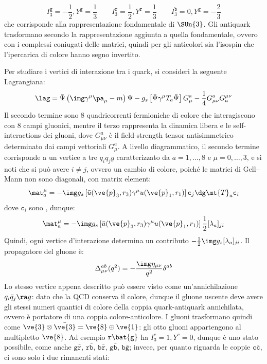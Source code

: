 \begin{equation*}
  I_3^\mathtt{g} = -\frac{1}{2} , Y^\mathtt{g} = \frac{1}{3}
  \qquad
  I_3^\mathtt{r} = \frac{1}{2} , Y^\mathtt{r} = \frac{1}{3}
  \qquad
  I_3^\mathtt{b} = 0 , Y^\mathtt{g} = - \frac{2}{3}
\end{equation*}
che corrisponde alla rappresentazione fondamentale di $ \SUn{3} $. Gli antiquark trasformano secondo la rappresentazione aggiunta a quella fondamentale, ovvero con i complessi coniugati delle matrici, quindi per gli anticolori sia l'isospin che l'ipercarica di colore hanno segno invertito.

Per studiare i vertici di interazione tra i quark, si consideri la seguente Lagrangiana:
\begin{equation}
  \lag = \bar{\Psi} \left( \img \gamma^\mu \pa_\mu - m \right) \Psi - g_s \left[ \bar{\Psi} \gamma^\mu T_a \bar{\Psi} \right] G_\mu^a - \frac{1}{4} G_{\mu \nu}^a G_a^{\mu \nu}
\end{equation}
Il secondo termine sono 8 quadricorrenti fermioniche di colore che interagiscono con 8 campi gluonici, mentre il terzo rappresenta la dinamica libera e le self-interactions dei gluoni, dove $ G_{\mu \nu}^a $ è il field-strength tensor antisimmetrico determinato dai campi vettoriali $ G_\mu^a $. A livello diagrammatico, il secondo termine corrisponde a un vertice a tre $ q_i q_j g $ caratterizzato da $ a = 1, \dots, 8 $ e $ \mu = 0 , \dots , 3 $, e si noti che si può avere $ i \neq j $, ovvero un cambio di colore, poiché le matrici di Gell--Mann non sono diagonali, con matrix element:
\begin{equation*}
  \mat^\mu_a = -\img g_s \left[ \bar{u}(\ve{p}_3 , r_3) \gamma^\mu u(\ve{p}_1 , r_1) \right] \mathtt{c}_j\dg \mt{T}_a \mathtt{c}_i
\end{equation*}
dove $ \mathtt{c}_i $ sono , dunque:
\begin{equation}
  \mat_a^\mu = - \img g_s \left[ \bar{u}(\ve{p}_3 , r_3) \gamma^\mu u(\ve{p}_1 , r_1) \right] \frac{1}{2} [\lambda_a]_{ji}
\end{equation}
Quindi, ogni vertice d'interazione determina un contributo $ - \frac{1}{2} \img g_s [\lambda_a]_{ji} $. Il propagatore del gluone è:
\begin{equation*}
  \Delta_{\mu \nu}^{ab}(q^2) = - \frac{\img \eta_{\mu \nu}}{q^2} \delta^{ab}
\end{equation*}
Lo stesso vertice appena descritto può essere visto come un'annichilazione $ q_i \bar{q}_j \ra g $: dato che la QCD conserva il colore, dunque il gluone uscente deve avere gli stessi numeri quantici di colore della coppia quark-antiquark annichilata, ovvero è portatore di una coppia colore-anticolore. I gluoni trasformano quindi come $ \ve{3} \otimes \bar{\ve{3}} = \ve{8} \oplus \ve{1} $: gli otto gluoni appartengono al multipletto $ \ve{8} $. Ad esempio $ \mathtt{r}\bat{\mathtt{g}} $ ha $ I_3^c = 1 , Y^c = 0 $, dunque è uno stato possibile, come anche $ \mathtt{g}\bar{\mathtt{r}} $, $ \mathtt{r}\bar{\mathtt{b}} $, $ \mathtt{b}\bar{\mathtt{r}} $, $ \mathtt{g}\bar{\mathtt{b}} $, $ \mathtt{b}\bar{\mathtt{g}} $; invece, per quanto riguarda le coppie $ \mathtt{c}\bar{\mathtt{c}} $, ci sono solo i due rimanenti stati:
